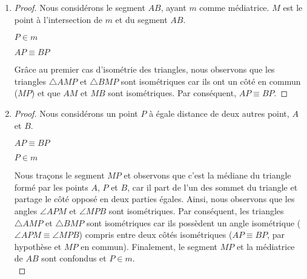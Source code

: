 \documentclass[a4paper,12pt]{article}
\begin{document}
\begin{enumerate}
    \item \begin{proof}
    Nous considérons le segment $AB$, ayant $m$ comme médiatrice. $M$ est le point à l'intersection de $m$ et du segment $AB$.
    
    \begin{hyp}
    $P \in m$ 
    \end{hyp}
    \begin{concl}
    $AP \equiv BP$
    \end{concl}
     
    Grâce au premier cas d'isométrie des triangles, nous observons que les triangles $\triangle AMP$ et $\triangle BMP$ sont isométriques car ils ont un côté en commun ($MP$) et que $AM$ et $MB$ sont isométriques. Par conséquent, $AP \equiv BP$.
     \end{proof}
     
    \item \begin{proof}
         Nous considérons un point $P$ à égale distance de deux autres point, $A$ et $B$. 
        
        \begin{hyp}
        $AP \equiv BP$
        \end{hyp}
        \begin{concl}
        $P \in m$
        \end{concl}
        Nous traçons le segment $MP$ et observons que c'est la médiane du triangle formé par les points $A$, $P$ et $B$, car il part        de l'un des sommet du triangle et partage le côté opposé en deux parties égales. Ainsi, nous observons que les angles $\angle      APM$ et $\angle MPB$ sont isométriques.  Par conséquent, les triangles $\triangle AMP$ et $\triangle BMP$ sont isométriques      car ils possèdent un angle isométrique ($\angle APM \equiv \angle MPB$) compris entre deux côtés isométriques ($AP \equiv      BP$, par hypothèse et $MP$ en commun). Finalement, le segment $MP$ et la médiatrice de $AB$ sont confondus et $P \in m$.\\
        \end{proof}
\end{enumerate}
\end{document}
